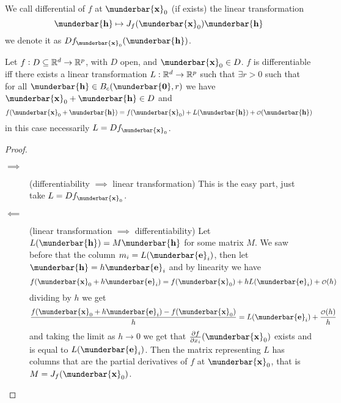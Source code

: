 \documentclass[14pt]{extarticle}
\renewcommand{\vec}[1]{\munderbar{\mathbf{#1}}}
\begin{document}
\begin{definition}[differential]
    We call differential of $f$ at $\vec{x}_0$ (if exists) the linear transformation
    \begin{equation}
        \vec{h} \mapsto J_f(\vec{x}_0) \vec{h}
    \end{equation}
    we denote it as $Df_{\vec{x}_0}(\vec{h})$.
\end{definition}

\begin{proposition}
    Let $f: D \subseteq \mathbb{R}^d \to \mathbb{R}^p$, with $D$ open, and $\vec{x}_0 \in D$.
    $f$ is differentiable iff there exists a linear transformation $L: \mathbb{R}^d \to \mathbb{R}^p$ such that $\exists r > 0$ such that for all $\vec{h} \in B_c(\vec{0}, r)$ we have $\vec{x}_0 + \vec{h} \in D$ and
    \begin{equation}
        f(\vec{x}_0 + \vec{h}) = f(\vec{x}_0) + L(\vec{h}) + \o(\vec{h})
    \end{equation}
    in this case necessarily $L = Df_{\vec{x}_0}$.
\end{proposition}

\begin{proof}
    \skiplineafterproof
    \begin{description}
        \item[$\implies$] (differentiability $\implies$ linear transformation)
            This is the easy part, just take $L = Df_{\vec{x}_0}$.
        \item[$\impliedby$] (linear transformation $\implies$ differentiability)
            Let $L(\vec{h}) = M \vec{h}$ for some matrix $M$.
            We saw before that the column $m_i = L(\vec{e}_i)$, then let $\vec{h} = h \vec{e}_i$ and by linearity we have
            \begin{equation}
                f(\vec{x}_0 + h \vec{e}_i) = f(\vec{x}_0) + h L(\vec{e}_i) + \o(h)
            \end{equation}
            dividing by $h$ we get
            \begin{equation}
                \frac{f(\vec{x}_0 + h \vec{e}_i) - f(\vec{x}_0)}{h} = L(\vec{e}_i) + \frac{\o(h)}{h}
            \end{equation}
            and taking the limit as $h \to 0$ we get that $\pdv{f}{x_i}()(\vec{x}_0)$ exists and is equal to $L(\vec{e}_i)$.
            Then the matrix representing $L$ has columns that are the partial derivatives of $f$ at $\vec{x}_0$, that is $M = J_f(\vec{x}_0)$.
    \end{description}
\end{proof}
\end{document}
